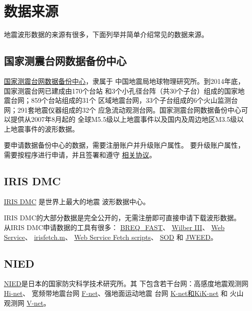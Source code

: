 \section{数据来源}
地震波形数据的来源有很多，下面列举并简单介绍常见的数据来源。

\subsection{国家测震台网数据备份中心}
\href{http://www.seisdmc.ac.cn/}{国家测震台网数据备份中心}，隶属于
中国地震局地球物理研究所。到2014年底，国家测震台网已建成由170个台站
和3个小孔径台阵（共30个子台）组成的国家地震台网；859个台站组成的31个
区域地震台网，33个子台组成的6个火山监测台网；291套地震仪器组成的32个
应急流动观测台网。国家测震台网数据备份中心可以提供从2007年8月起的
全球M5.5级以上地震事件以及国内及周边地区M3.5级以上地震事件的波形数据。

要申请数据备份中心的数据，需要注册账户并升级账户属性。
要升级账户属性，需要按程序进行申请，并且签署和遵守
\href{http://www.seisdmc.ac.cn/class/view?id=8}{相关协议}。

\subsection{IRIS DMC}
\label{subsec:IRIS}
\href{http://ds.iris.edu/ds/nodes/dmc/}{IRIS DMC} 是世界上最大的地震
波形数据中心。

IRIS DMC的大部分数据是完全公开的，无需注册即可直接申请下载波形数据。
从IRIS DMC申请数据的工具有很多：
\href{https://ds.iris.edu/ds/nodes/dmc/manuals/breq_fast/}{BREQ\_FAST}、
\href{http://ds.iris.edu/wilber3/find_event}{Wilber III}、
\href{http://service.iris.edu/}{Web Service}、
\href{http://ds.iris.edu/ds/nodes/dmc/software/downloads/irisfetch.m/}{irisfetch.m}、
\href{https://seiscode.iris.washington.edu/projects/ws-fetch-scripts}{Web Service Fetch scripts}、
\href{http://www.seis.sc.edu/sod/}{SOD} 和
\href{https://ds.iris.edu/ds/nodes/dmc/software/downloads/jweed/}{JWEED}。

\subsection{NIED}
\label{subsec:NIED}
\href{http://www.bosai.go.jp/}{NIED}是日本的国家防灾科学技术研究所。其
下包含若干台网：高感度地震观测网 \href{http://www.hinet.bosai.go.jp/}{Hi-net}、
宽频带地震台网 \href{http://www.fnet.bosai.go.jp/}{F-net}、强地面运动地震
台网 \href{http://www.kyoshin.bosai.go.jp/}{K-net和KiK-net} 和
火山观测网 \href{http://www.vnet.bosai.go.jp/}{V-net}。

